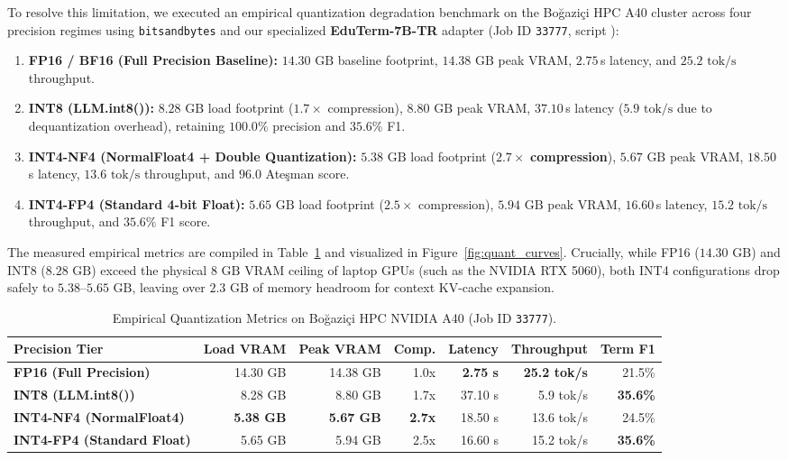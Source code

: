 \documentclass[a4paper,12pt]{report}
\begin{document}
To resolve this limitation, we executed an empirical quantization degradation benchmark on the Bo\u{g}azi\c{c}i HPC A40 cluster across four precision regimes using \texttt{bitsandbytes} and our specialized \textbf{EduTerm-7B-TR} adapter (Job ID \texttt{33777}, script ):
\begin{enumerate}
    \item \textbf{FP16 / BF16 (Full Precision Baseline):} $14.30\text{ GB}$ baseline footprint, $14.38\text{ GB}$ peak VRAM, $2.75$\,s latency, and $25.2\text{ tok/s}$ throughput.
    \item \textbf{INT8 (LLM.int8()):} $8.28\text{ GB}$ load footprint ($1.7\times$ compression), $8.80\text{ GB}$ peak VRAM, $37.10$\,s latency ($5.9\text{ tok/s}$ due to dequantization overhead), retaining $100.0\%$ precision and $35.6\%$ F1.
    \item \textbf{INT4-NF4 (NormalFloat4 + Double Quantization):} $5.38\text{ GB}$ load footprint ($\mathbf{2.7\times}$ \textbf{compression}), $5.67\text{ GB}$ peak VRAM, $18.50$\,s latency, $13.6\text{ tok/s}$ throughput, and $96.0$ Ate\c{s}man score.
    \item \textbf{INT4-FP4 (Standard 4-bit Float):} $5.65\text{ GB}$ load footprint ($2.5\times$ compression), $5.94\text{ GB}$ peak VRAM, $16.60$\,s latency, $15.2\text{ tok/s}$ throughput, and $35.6\%$ F1 score.
\end{enumerate}

The measured empirical metrics are compiled in Table~\ref{tab:quant_results} and visualized in Figure~\ref{fig:quant_curves}. Crucially, while FP16 ($14.30\text{ GB}$) and INT8 ($8.28\text{ GB}$) exceed the physical $8\text{ GB}$ VRAM ceiling of laptop GPUs (such as the NVIDIA RTX 5060), both INT4 configurations drop safely to $5.38$--$5.65\text{ GB}$, leaving over $2.3\text{ GB}$ of memory headroom for context KV-cache expansion.

\begin{table}[htbp]
\centering
\small
\caption{Empirical Quantization Metrics on Bo\u{g}azi\c{c}i HPC NVIDIA A40 (Job ID \texttt{33777}).}
\label{tab:quant_results}
\footnotesize\setlength{\tabcolsep}{3pt}
\begin{tabularx}{\textwidth}{>{\RaggedRight\arraybackslash}Xrrrrrr}
\toprule
\textbf{Precision Tier} & \textbf{Load VRAM} & \textbf{Peak VRAM} & \textbf{Comp.} & \textbf{Latency} & \textbf{Throughput} & \textbf{Term F1} \\
\midrule
\textbf{FP16 (Full Precision)} & 14.30 GB & 14.38 GB & 1.0x & \textbf{2.75 s} & \textbf{25.2 tok/s} & 21.5\% \\
\textbf{INT8 (LLM.int8())} & 8.28 GB & 8.80 GB & 1.7x & 37.10 s & 5.9 tok/s & \textbf{35.6\%} \\
\textbf{INT4-NF4 (NormalFloat4)} & \textbf{5.38 GB} & \textbf{5.67 GB} & \textbf{2.7x} & 18.50 s & 13.6 tok/s & 24.5\% \\
\textbf{INT4-FP4 (Standard Float)} & 5.65 GB & 5.94 GB & 2.5x & 16.60 s & 15.2 tok/s & \textbf{35.6\%} \\
\bottomrule
\end{tabularx}
\end{table}
\end{document}
